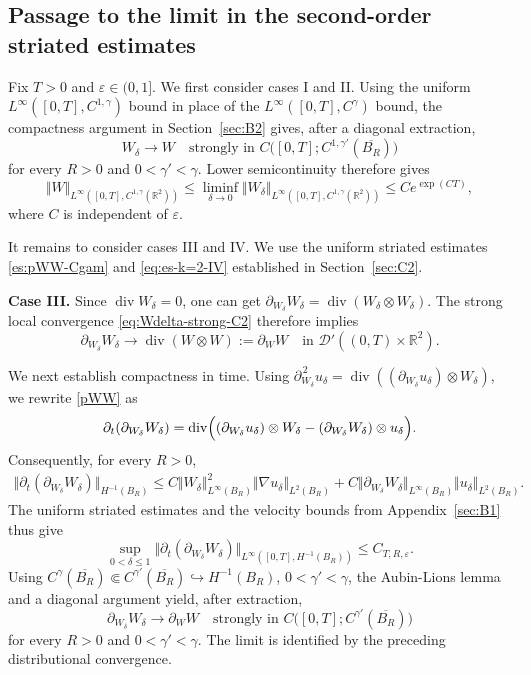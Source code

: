 \documentclass[reqno,11pt,a4paper]{amsart}
\begin{document}


\subsection{Passage to the limit in the second-order striated estimates}
\label{sec:B3}

Fix $T>0$ and $\varepsilon\in(0,1]$.
We first consider cases I and II.
Using the uniform $L^\infty([0,T],C^{1,\gamma})$ bound
in place of the $L^\infty([0,T],C^\gamma)$ bound,
the compactness argument in Section~\ref{sec:B2} gives,
after a diagonal extraction,
\[
  W_\delta\longrightarrow W
  \quad\text{strongly in }
  C\bigl([0,T];C^{1,\gamma'}(\overline{B_R})\bigr)
\]
for every $R>0$ and $0<\gamma'<\gamma$.
Lower semicontinuity therefore gives
\[
  \Vert W\Vert _{L^\infty([0,T],C^{1,\gamma}(\mathbb R^2))}
  \leq
  \liminf_{\delta\to0}
  \Vert W_\delta\Vert _{L^\infty([0,T],C^{1,\gamma}(\mathbb R^2))}
  \leq Ce^{\exp(CT)},
\]
where $C$ is independent of $\varepsilon$.

It remains to consider cases III and IV.
We use the uniform striated estimates
\eqref{es:pWW-Cgam} and \eqref{eq:es-k=2-IV}
established in Section~\ref{sec:C2}.

\medskip
\noindent\textbf{Case III.}
Since $\operatorname{div}W_\delta=0$, one can get $\partial_{W_\delta}W_\delta
  =\operatorname{div}(W_\delta\otimes W_\delta)$. 
The strong local convergence \eqref{eq:Wdelta-strong-C2}
therefore implies
\[
  \partial_{W_\delta}W_\delta
  \longrightarrow
  \operatorname{div}(W\otimes W)
  :=\partial_WW
  \quad\text{in }
  \mathcal D'((0,T)\times\mathbb R^2).
\]

We next establish compactness in time.
Using
$\partial_{W_\delta}^{\,2}u_\delta
=\operatorname{div}
((\partial_{W_\delta}u_\delta)\otimes W_\delta)$,
we rewrite \eqref{pWW} as
\[
  \partial_t(\partial_{W_\delta}W_\delta)
  =
  \operatorname{div}\Bigl(
    (\partial_{W_\delta}u_\delta)\otimes W_\delta
    -(\partial_{W_\delta}W_\delta)\otimes u_\delta
  \Bigr).
\]
Consequently, for every $R>0$,
\begin{align*}
  \Vert \partial_t(\partial_{W_\delta}W_\delta)
    \Vert _{H^{-1}(B_R)}
  \leq
  C\Vert W_\delta\Vert _{L^\infty(B_R)}^2
    \Vert \nabla u_\delta\Vert _{L^2(B_R)}
  +
  C\Vert \partial_{W_\delta}W_\delta\Vert _{L^\infty(B_R)}
    \Vert u_\delta\Vert _{L^2(B_R)}.
\end{align*}
The uniform striated estimates and the velocity bounds
from Appendix~\ref{sec:B1} thus give
\[
  \sup_{0<\delta\leq1}
  \Vert \partial_t(\partial_{W_\delta}W_\delta)\Vert _
    {L^\infty([0,T],H^{-1}(B_R))}
  \leq C_{T,R,\varepsilon}.
\]
Using
$C^\gamma(\overline{B_R})
  \Subset C^{\gamma'}(\overline{B_R})
  \hookrightarrow H^{-1}(B_R)$,
$0<\gamma'<\gamma$,
the Aubin-Lions lemma and a diagonal argument yield,
after extraction,
\[
  \partial_{W_\delta}W_\delta
  \longrightarrow\partial_WW
  \quad\text{strongly in }
  C\bigl([0,T];C^{\gamma'}(\overline{B_R})\bigr)
\]
for every $R>0$ and $0<\gamma'<\gamma$.
The limit is identified by the preceding distributional
convergence.
\end{document}
